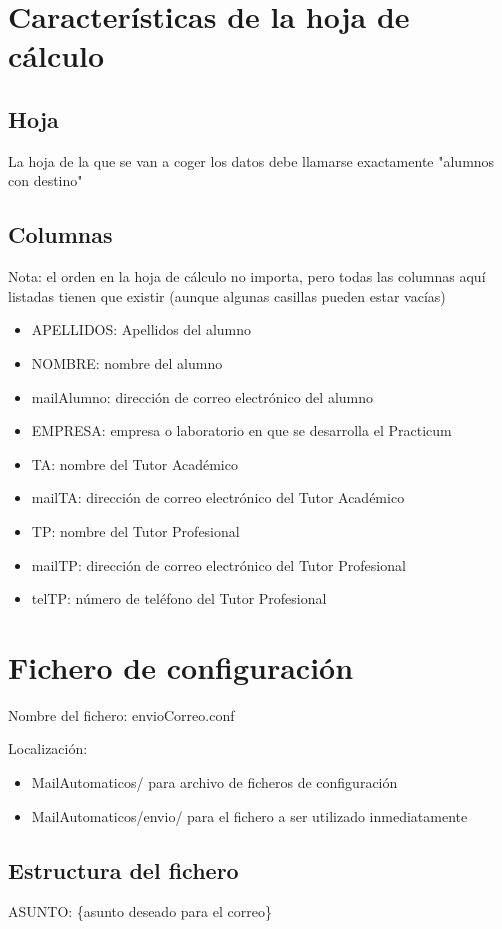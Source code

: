 \documentclass[11pt]{article}
\begin{document}
\section{Características de la hoja de cálculo}
\label{sec-3}
\subsection{Hoja}
\label{sec-3-1}
La hoja de la que se van a coger los datos debe llamarse exactamente "alumnos con destino"
\subsection{Columnas}
\label{sec-3-2}
Nota: el orden en la hoja de cálculo no importa, pero todas las columnas aquí listadas tienen que existir (aunque algunas casillas pueden estar vacías)
\begin{itemize}
\item APELLIDOS: Apellidos del alumno
\item NOMBRE: nombre del alumno
\item mailAlumno: dirección de correo electrónico del alumno
\item EMPRESA: empresa o laboratorio en que se desarrolla el Practicum
\item TA: nombre del Tutor Académico
\item mailTA: dirección de correo electrónico del Tutor Académico
\item TP: nombre del Tutor Profesional
\item mailTP: dirección de correo electrónico del Tutor Profesional
\item telTP: número de teléfono del Tutor Profesional
\end{itemize}

\section{Fichero de configuración}
\label{sec-4}
Nombre del fichero: envioCorreo.conf

Localización:
\begin{itemize}
\item MailAutomaticos/ para archivo de ficheros de configuración
\item MailAutomaticos/envio/ para el fichero a ser utilizado inmediatamente
\end{itemize}
\subsection{Estructura del fichero}
\label{sec-4-1}
ASUNTO: \{asunto deseado para el correo\}
\end{document}
